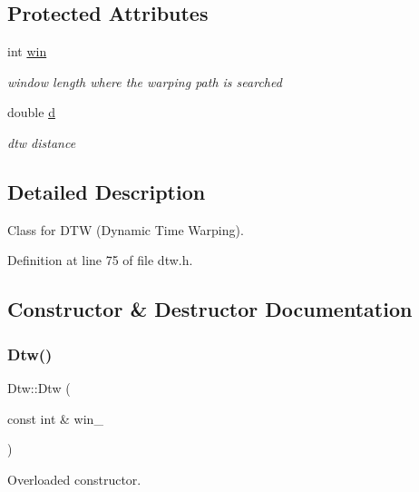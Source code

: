 \subsection*{Protected Attributes}
\begin{DoxyCompactItemize}
\item 
\mbox{\label{classassistive__rehab_1_1Dtw_a136ae6493254529accbdcf73cdce4ce6}} 
int \mbox{\hyperlink{classassistive__rehab_1_1Dtw_a136ae6493254529accbdcf73cdce4ce6}{win}}
\begin{DoxyCompactList}\small\item\em window length where the warping path is searched \end{DoxyCompactList}\item 
\mbox{\label{classassistive__rehab_1_1Dtw_a2931d56d23435f12a7697dde5ec605ed}} 
double \mbox{\hyperlink{classassistive__rehab_1_1Dtw_a2931d56d23435f12a7697dde5ec605ed}{d}}
\begin{DoxyCompactList}\small\item\em dtw distance \end{DoxyCompactList}\end{DoxyCompactItemize}


\subsection{Detailed Description}
Class for D\+TW (Dynamic Time Warping). 

Definition at line 75 of file dtw.\+h.



\subsection{Constructor \& Destructor Documentation}
\mbox{\label{classassistive__rehab_1_1Dtw_adb11d58b5482f14ade22f5f630a24843}} 
\subsubsection{\texorpdfstring{Dtw()}{Dtw()}}
{\footnotesize\ttfamily Dtw\+::\+Dtw (\begin{DoxyParamCaption}\item[{const int \&}]{win\+\_\+ }\end{DoxyParamCaption})}



Overloaded constructor. 


